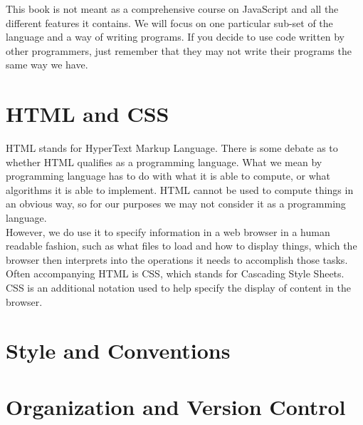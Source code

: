 This book is not meant as a comprehensive course on JavaScript and all the different features it contains. We will focus on one particular sub-set of the language and a way of writing programs. If you decide to use code written by other programmers, just remember that they may not write their programs the same way we have.

\section{HTML and CSS}

HTML stands for HyperText Markup Language. There is some debate as to whether HTML qualifies as a programming language. What we mean by programming language has to do with what it is able to compute, or what algorithms it is able to implement. HTML cannot be used to compute things in an obvious way, so for our purposes we may not consider it as a programming language.\\

However, we do use it to specify information in a web browser in a human readable fashion, such as what files to load and how to display things, which the browser then interprets into the operations it needs to accomplish those tasks. Often accompanying HTML is CSS, which stands for Cascading Style Sheets. CSS is an additional notation used to help specify the display of content in the browser.

\section{Style and Conventions}

\section{Organization and Version Control}